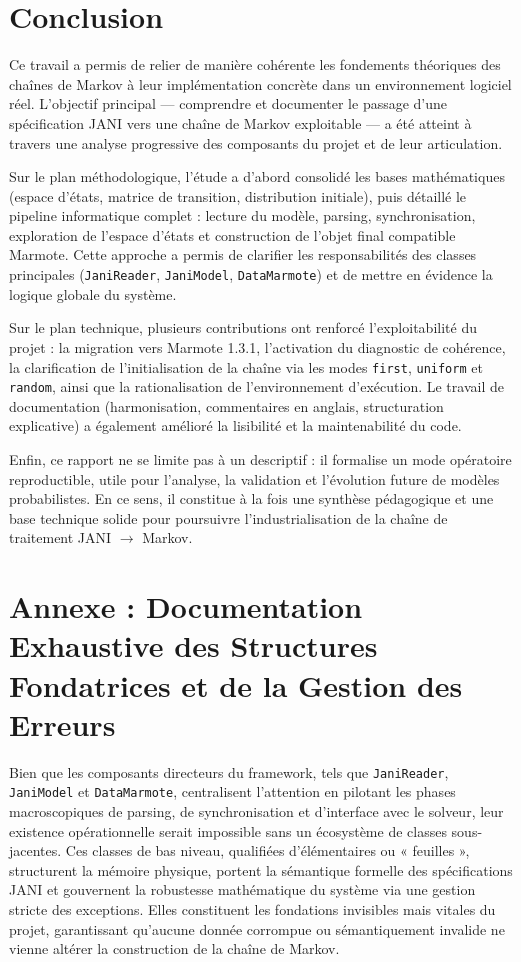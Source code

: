 \documentclass[14pt, a4paper]{extarticle}
\begin{document}
\section{Conclusion}

Ce travail a permis de relier de manière cohérente les fondements théoriques des chaînes de Markov à leur implémentation concrète dans un environnement logiciel réel. L’objectif principal --- comprendre et documenter le passage d’une spécification JANI vers une chaîne de Markov exploitable --- a été atteint à travers une analyse progressive des composants du projet et de leur articulation.

Sur le plan méthodologique, l’étude a d’abord consolidé les bases mathématiques (espace d’états, matrice de transition, distribution initiale), puis détaillé le pipeline informatique complet : lecture du modèle, parsing, synchronisation, exploration de l’espace d’états et construction de l’objet final compatible Marmote. Cette approche a permis de clarifier les responsabilités des classes principales (\texttt{JaniReader}, \texttt{JaniModel}, \texttt{DataMarmote}) et de mettre en évidence la logique globale du système.

Sur le plan technique, plusieurs contributions ont renforcé l’exploitabilité du projet : la migration vers Marmote 1.3.1, l’activation du diagnostic de cohérence, la clarification de l’initialisation de la chaîne via les modes \texttt{first}, \texttt{uniform} et \texttt{random}, ainsi que la rationalisation de l’environnement d’exécution. Le travail de documentation (harmonisation, commentaires en anglais, structuration explicative) a également amélioré la lisibilité et la maintenabilité du code.

Enfin, ce rapport ne se limite pas à un descriptif : il formalise un mode opératoire reproductible, utile pour l’analyse, la validation et l’évolution future de modèles probabilistes. En ce sens, il constitue à la fois une synthèse pédagogique et une base technique solide pour poursuivre l’industrialisation de la chaîne de traitement JANI \(\rightarrow\) Markov.

\section*{Annexe : Documentation Exhaustive des Structures Fondatrices et de la Gestion des Erreurs}
\label{annexe:classes}

Bien que les composants directeurs du framework, tels que \texttt{JaniReader}, \texttt{JaniModel} et \texttt{DataMarmote}, centralisent l'attention en pilotant les phases macroscopiques de parsing, de synchronisation et d'interface avec le solveur, leur existence opérationnelle serait impossible sans un écosystème de classes sous-jacentes. Ces classes de bas niveau, qualifiées d'élémentaires ou « feuilles », structurent la mémoire physique, portent la sémantique formelle des spécifications JANI et gouvernent la robustesse mathématique du système via une gestion stricte des exceptions. Elles constituent les fondations invisibles mais vitales du projet, garantissant qu'aucune donnée corrompue ou sémantiquement invalide ne vienne altérer la construction de la chaîne de Markov.
\end{document}
